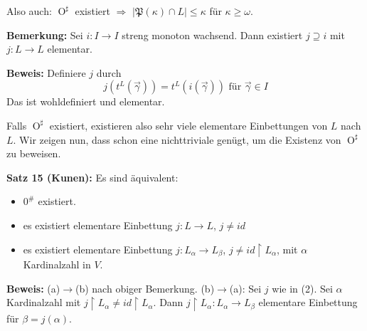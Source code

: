 \documentclass[a4paper,fontsize=11pt]{scrartcl}
\newcommand{\osharp}{\operatorname{O}^\sharp}
\begin{document}
Also auch: $\osharp$ existiert $\Rightarrow$
$|\mathfrak{P}(\kappa)\cap L|\le\kappa$ für $\kappa\ge\omega$.

{\bf Bemerkung:} Sei $i : I \rightarrow I$ streng monoton
wachsend. Dann existiert $j\supseteq i$ mit $j:L\rightarrow L$
elementar.

{\bf Beweis:} Definiere $j$ durch $$
j(t^L(\vec{\gamma}))=t^L(i(\vec{\gamma}))\mbox{ für }\vec{\gamma}\in
I $$ Das ist wohldefiniert und elementar.

Falls $\osharp$ existiert, existieren also sehr viele elementare
Einbettungen von $L$ nach $L$. Wir zeigen nun, dass schon eine
nichttriviale genügt, um die Existenz von $\osharp$ zu beweisen.


{\bf Satz 15 (Kunen):} Es sind äquivalent: \begin{itemize}
		\item[(a)] $0^{\#}$ existiert.
		\item[(b)] es existiert elementare Einbettung $j\colon L\to L$, $j\neq id$
		\item[(c)] es existiert elementare Einbettung $j\colon L_{\alpha}\to L_{\beta}$, $j\neq id\upharpoonright L_{\alpha}$, mit $\alpha$ Kardinalzahl in $V$.		
	\end{itemize}
	
	{\bf Beweis:} (a)$\to$(b) nach obiger Bemerkung.
		(b)$\to$(a): Sei $j$ wie in (2). 
		Sei $\alpha$ Kardinalzahl mit $j\upharpoonright L_{\alpha}\neq id\upharpoonright L_{\alpha}$.
		Dann $j\upharpoonright L_{\alpha}\colon L_{\alpha}\to L_{\beta}$ elementare Einbettung für $\beta=j(\alpha)$.
		
\end{document}
